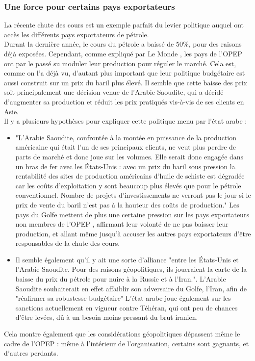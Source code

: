 \subsubsection{Une force pour certains pays exportateurs}
La récente chute des cours est un exemple parfait du levier politique auquel ont accès les différents pays exportateurs de pétrole.\\
Durant la dernière année, le cours du pétrole a baissé de 50\%, pour des raisons déjà exposées. Cependant, comme expliqué par Le Monde \cite{ArabCleJeu}, les pays de l’OPEP ont par le passé su moduler leur production pour réguler le marché. Cela est, comme on l’a déjà vu, d’autant plus important que leur politique budgétaire est aussi construit sur un prix du baril plus élevé. Il semble que cette baisse des prix soit principalement une décision venue de l’Arabie Saoudite, qui a décidé d’augmenter sa production et réduit les prix pratiqués vis-à-vis de ses clients en Asie.\\
Il y a plusieurs hypothèses pour expliquer cette politique menu par l’état arabe :
\begin{itemize}
	\item "L’Arabie Saoudite, confrontée à la montée en puissance de la production américaine qui était l’un de ses principaux clients, ne veut plus perdre de parts de marché et donc joue sur les volumes. Elle serait donc engagée dans un bras de fer avec les États-Unis : avec un prix du baril sous pression la rentabilité des sites de production américains d’huile de schiste est dégradée car les coûts d’exploitation y sont beaucoup plus élevés que pour le pétrole conventionnel. Nombre de projets d’investissements ne verront pas le jour si le prix de vente du baril n’est pas à la hauteur des coûts de production." Les pays du Golfe mettent de plus une certaine pression sur les pays exportateurs non membres de l’OPEP , affirmant leur volonté de ne pas baisser leur production, et allant même jusqu’à accuser les autres pays exportateurs d’être responsables de la chute des cours.\cite{mndOpepPression}
	\item Il semble également qu’il y ait une sorte d’alliance "entre les États-Unis et l’Arabie Saoudite. Pour des raisons géopolitiques, ils joueraient la carte de la baisse du prix du pétrole pour nuire à la Russie et à l’Iran.". L’Arabie Saoudite souhaiterait en effet affaiblir son adversaire du Golfe, l’Iran, afin de "réafirmer sa robustesse budgétaire" L’état arabe joue également sur les sanctions actuellement en vigueur contre Téhéran, qui ont peu de chances d’être levées, dû à un besoin moins pressant du brut iranien. \cite{rfiASblokIran}
\end{itemize}
Cela montre également que les considérations géopolitiques dépassent même le cadre de l’OPEP : même à l’intérieur de l’organisation, certains sont gagnants, et d’autres perdants.

